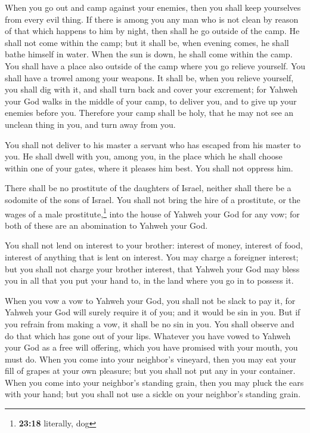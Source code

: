  When you go out and camp against your enemies, then you
shall keep yourselves from every evil thing.  If there is
among you any man who is not clean by reason of that which happens to
him by night, then shall he go outside of the camp. He shall not come
within the camp;  but it shall be, when evening comes, he
shall bathe himself in water. When the sun is down, he shall come within
the camp.  You shall have a place also outside of the
camp where you go relieve yourself.  You shall have a
trowel among your weapons. It shall be, when you relieve yourself, you
shall dig with it, and shall turn back and cover your excrement;
 for Yahweh your God walks in the middle of your camp, to
deliver you, and to give up your enemies before you. Therefore your camp
shall be holy, that he may not see an unclean thing in you, and turn
away from you.

 You shall not deliver to his master a servant who has
escaped from his master to you.  He shall dwell with you,
among you, in the place which he shall choose within one of your gates,
where it pleases him best. You shall not oppress him.

 There shall be no prostitute of the daughters of Israel,
neither shall there be a sodomite of the sons of Israel. 
You shall not bring the hire of a prostitute, or the wages of a male
prostitute,\footnote{\textbf{23:18} literally, dog} into the house of
Yahweh your God for any vow; for both of these are an abomination to
Yahweh your God.

 You shall not lend on interest to your brother: interest
of money, interest of food, interest of anything that is lent on
interest.  You may charge a foreigner interest; but you
shall not charge your brother interest, that Yahweh your God may bless
you in all that you put your hand to, in the land where you go in to
possess it.

 When you vow a vow to Yahweh your God, you shall not be
slack to pay it, for Yahweh your God will surely require it of you; and
it would be sin in you.  But if you refrain from making a
vow, it shall be no sin in you.  You shall observe and do
that which has gone out of your lips. Whatever you have vowed to Yahweh
your God as a free will offering, which you have promised with your
mouth, you must do.  When you come into your neighbor's
vineyard, then you may eat your fill of grapes at your own pleasure; but
you shall not put any in your container.  When you come
into your neighbor's standing grain, then you may pluck the ears with
your hand; but you shall not use a sickle on your neighbor's standing
grain.

